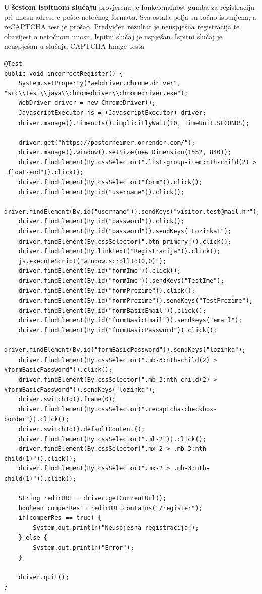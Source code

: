 	\newpage
	
	U \textbf{šestom ispitnom slučaju} provjerena je funkcionalnost gumba za registraciju pri unosu adrese e-pošte netočnog formata. Sva ostala polja su točno ispunjena, a reCAPTCHA test je prošao. Predviđen rezultat je neuspješna registracija te obavijest o netočnom unosu. Ispitni slučaj je uspješan.
	Ispitni slučaj je neuspješan u slučaju CAPTCHA Image testa 

			\begin{lstlisting}
@Test
public void incorrectRegister() {
	System.setProperty("webdriver.chrome.driver", "src\\test\\java\\chromedriver\\chromedriver.exe");
	WebDriver driver = new ChromeDriver();
	JavascriptExecutor js = (JavascriptExecutor) driver;
	driver.manage().timeouts().implicitlyWait(10, TimeUnit.SECONDS);
	
	driver.get("https://posterheimer.onrender.com/");
	driver.manage().window().setSize(new Dimension(1552, 840));
	driver.findElement(By.cssSelector(".list-group-item:nth-child(2) > .float-end")).click();
	driver.findElement(By.cssSelector("form")).click();
	driver.findElement(By.id("username")).click();
	driver.findElement(By.id("username")).sendKeys("visitor.test@mail.hr");
	driver.findElement(By.id("password")).click();
	driver.findElement(By.id("password")).sendKeys("Lozinka1");
	driver.findElement(By.cssSelector(".btn-primary")).click();
	driver.findElement(By.linkText("Registracija")).click();
	js.executeScript("window.scrollTo(0,0)");
	driver.findElement(By.id("formIme")).click();
	driver.findElement(By.id("formIme")).sendKeys("TestIme");
	driver.findElement(By.id("formPrezime")).click();
	driver.findElement(By.id("formPrezime")).sendKeys("TestPrezime");
	driver.findElement(By.id("formBasicEmail")).click();
	driver.findElement(By.id("formBasicEmail")).sendKeys("email");
	driver.findElement(By.id("formBasicPassword")).click();
	driver.findElement(By.id("formBasicPassword")).sendKeys("lozinka");
	driver.findElement(By.cssSelector(".mb-3:nth-child(2) > #formBasicPassword")).click();
	driver.findElement(By.cssSelector(".mb-3:nth-child(2) > #formBasicPassword")).sendKeys("lozinka");
	driver.switchTo().frame(0);
	driver.findElement(By.cssSelector(".recaptcha-checkbox-border")).click();
	driver.switchTo().defaultContent();
	driver.findElement(By.cssSelector(".ml-2")).click();
	driver.findElement(By.cssSelector(".mx-2 > .mb-3:nth-child(1)")).click();
	driver.findElement(By.cssSelector(".mx-2 > .mb-3:nth-child(1)")).click();
	
	String redirURL = driver.getCurrentUrl();
	boolean comperRes = redirURL.contains("/register");
	if(comperRes == true) {
		System.out.println("Neuspjesna registracija");
	} else {
		System.out.println("Error");
	}
	
	driver.quit();
}	  
			\end{lstlisting}
			
